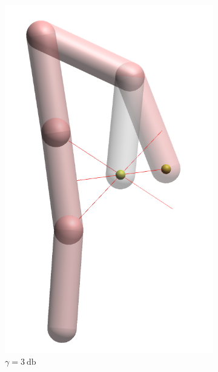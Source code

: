 \begin{figure}[h]
    \centering
    \begin{subfigure}[b]{0.2\textwidth}
        \includegraphics[width=\textwidth]{Figures/simple_distortion_3.png}
        \caption{$\gamma = \SI{3}{\decibel}$}
    \end{subfigure}
    ~ %
    \begin{subfigure}[b]{0.2\textwidth}

\end{subfigure}
\end{figure}
